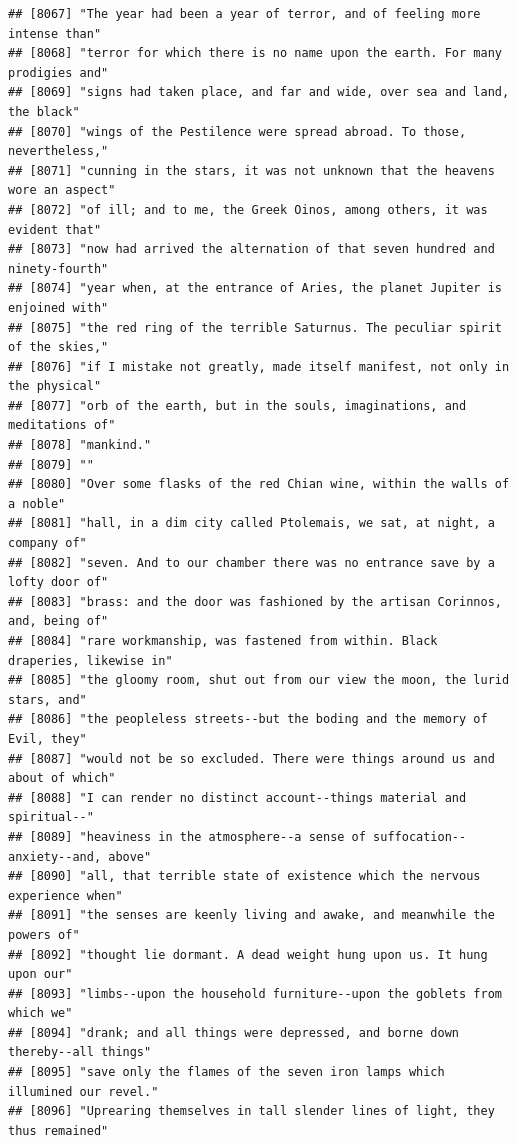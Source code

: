 \documentclass{article}\usepackage[]{graphicx}\usepackage[]{color}
\makeatletter
\newenvironment{kframe}{%
 \def\at@end@of@kframe{}%
 \ifinner\ifhmode%
  \def\at@end@of@kframe{\end{minipage}}%
  \begin{minipage}{\columnwidth}%
 \fi\fi%
 \def\FrameCommand##1{\hskip\@totalleftmargin \hskip-\fboxsep
 \colorbox{shadecolor}{##1}\hskip-\fboxsep
     \hskip-\linewidth \hskip-\@totalleftmargin \hskip\columnwidth}%
 \MakeFramed {\advance\hsize-\width
   \@totalleftmargin\z@ \linewidth\hsize
   \@setminipage}}%
 {\par\unskip\endMakeFramed%
 \at@end@of@kframe}
\newenvironment{knitrout}{}{} %
\makeatother
\begin{document}
\begin{knitrout}
\begin{kframe}
\begin{verbatim}
## [8067] "The year had been a year of terror, and of feeling more intense than"        
## [8068] "terror for which there is no name upon the earth. For many prodigies and"    
## [8069] "signs had taken place, and far and wide, over sea and land, the black"       
## [8070] "wings of the Pestilence were spread abroad. To those, nevertheless,"         
## [8071] "cunning in the stars, it was not unknown that the heavens wore an aspect"    
## [8072] "of ill; and to me, the Greek Oinos, among others, it was evident that"       
## [8073] "now had arrived the alternation of that seven hundred and ninety-fourth"     
## [8074] "year when, at the entrance of Aries, the planet Jupiter is enjoined with"    
## [8075] "the red ring of the terrible Saturnus. The peculiar spirit of the skies,"    
## [8076] "if I mistake not greatly, made itself manifest, not only in the physical"    
## [8077] "orb of the earth, but in the souls, imaginations, and meditations of"        
## [8078] "mankind."                                                                    
## [8079] ""                                                                            
## [8080] "Over some flasks of the red Chian wine, within the walls of a noble"         
## [8081] "hall, in a dim city called Ptolemais, we sat, at night, a company of"        
## [8082] "seven. And to our chamber there was no entrance save by a lofty door of"     
## [8083] "brass: and the door was fashioned by the artisan Corinnos, and, being of"    
## [8084] "rare workmanship, was fastened from within. Black draperies, likewise in"    
## [8085] "the gloomy room, shut out from our view the moon, the lurid stars, and"      
## [8086] "the peopleless streets--but the boding and the memory of Evil, they"         
## [8087] "would not be so excluded. There were things around us and about of which"    
## [8088] "I can render no distinct account--things material and spiritual--"           
## [8089] "heaviness in the atmosphere--a sense of suffocation--anxiety--and, above"    
## [8090] "all, that terrible state of existence which the nervous experience when"     
## [8091] "the senses are keenly living and awake, and meanwhile the powers of"         
## [8092] "thought lie dormant. A dead weight hung upon us. It hung upon our"           
## [8093] "limbs--upon the household furniture--upon the goblets from which we"         
## [8094] "drank; and all things were depressed, and borne down thereby--all things"    
## [8095] "save only the flames of the seven iron lamps which illumined our revel."     
## [8096] "Uprearing themselves in tall slender lines of light, they thus remained"     

\end{verbatim}
\end{kframe}
\end{knitrout}
\end{document}
